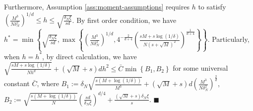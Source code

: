 \documentclass[11pt]{article}
\newcommand{\proofend}{\hfill$\blacksquare$}
\begin{document}
Furthermore, Assumption \ref{ass:moment-assumptions} requires $h$ to satisfy 
$\left(\frac{M^3}{N\delta_N^2}\right)^{1/d}\leq h\leq\sqrt{\frac{\delta_N\xi}{sd}}$. By first order condition, we have $h^*=\min\left\{\sqrt{\frac{\delta_N\xi}{sd}},\max\left\{\left(\frac{M^3}{N\delta_N^2}\right)^{1/d},4^{-\frac{2}{d+4}}\left(\frac{sM+s\log(1/\delta)}{N(s+\sqrt{M})^2}\right)^{\frac{1}{d+4}}\right\}\right\}$. Particularly, when $h=h^*$, by direct calculation, we have $\sqrt{\frac{sM+s\log(1/\delta)}{Nh^d}}+(\sqrt{M}+s)dh^2\leq\bar{C}\min\left\{B_{1},B_2\right\}$ for some universal constant $\bar{C}$, where $B_1:=\delta_N\sqrt{\frac{s(M+\log(1/\delta))}{M^3}}+(\sqrt{M}+s)d\left(\frac{M^3}{N\delta_N^2}\right)^{\frac{2}{d}}$,
$B_2:=\sqrt{\frac{s(M+\log(1/\delta))}{N}}\left(\frac{sd}{\delta_N\xi}\right)^{d/4}\!\!+\frac{(\sqrt{M}+s)\delta_N\xi}{s}$.
\proofend
\end{document}
